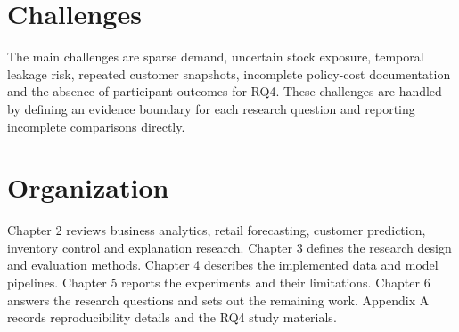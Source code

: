 \section{Challenges}
The main challenges are sparse demand, uncertain stock exposure, temporal leakage risk, repeated customer snapshots, incomplete policy-cost documentation and the absence of participant outcomes for RQ4. These challenges are handled by defining an evidence boundary for each research question and reporting incomplete comparisons directly.

\section{Organization}
Chapter 2 reviews business analytics, retail forecasting, customer prediction, inventory control and explanation research. Chapter 3 defines the research design and evaluation methods. Chapter 4 describes the implemented data and model pipelines. Chapter 5 reports the experiments and their limitations. Chapter 6 answers the research questions and sets out the remaining work. Appendix A records reproducibility details and the RQ4 study materials.
